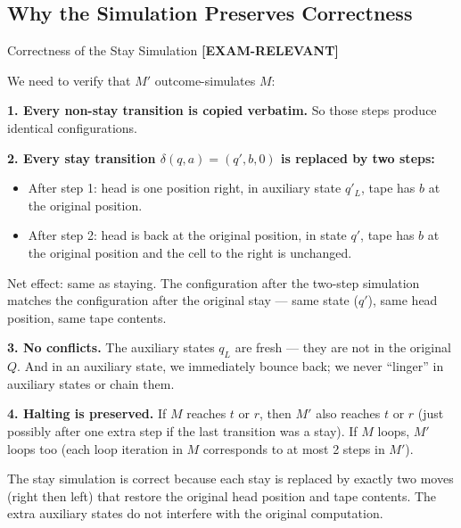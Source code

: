 \documentclass[11pt,a4paper]{article}
\newcommand{\kemark}{\textcolor{red!70!black}{\textbf{[EXAM-RELEVANT]}}}
\newcommand{\kt}[1]{\par\vspace{0.3em}\colorbox{yellow!60}{\parbox{\dimexpr\linewidth-2\fboxsep}{#1}}\vspace{0.3em}}
\begin{document}
\subsection{Why the Simulation Preserves Correctness}

\begin{conceptbox}{Correctness of the Stay Simulation \kemark}

We need to verify that $M'$ outcome-simulates $M$:

\textbf{1. Every non-stay transition is copied verbatim.} So those steps produce identical configurations.

\textbf{2. Every stay transition $\delta(q,a) = (q', b, 0)$ is replaced by two steps:}
\begin{itemize}[nosep]
\item After step 1: head is one position right, in auxiliary state $q'_L$, tape has $b$ at the original position.
\item After step 2: head is back at the original position, in state $q'$, tape has $b$ at the original position and the cell to the right is unchanged.
\end{itemize}
Net effect: same as staying. The configuration after the two-step simulation matches the configuration after the original stay --- same state ($q'$), same head position, same tape contents.

\textbf{3. No conflicts.} The auxiliary states $q_L$ are fresh --- they are not in the original $Q$. And in an auxiliary state, we immediately bounce back; we never ``linger'' in auxiliary states or chain them.

\textbf{4. Halting is preserved.} If $M$ reaches $t$ or $r$, then $M'$ also reaches $t$ or $r$ (just possibly after one extra step if the last transition was a stay). If $M$ loops, $M'$ loops too (each loop iteration in $M$ corresponds to at most 2 steps in $M'$).

\kt{The stay simulation is correct because each stay is replaced by exactly two moves (right then left) that restore the original head position and tape contents. The extra auxiliary states do not interfere with the original computation.}
\end{conceptbox}

\newpage

\end{document}
